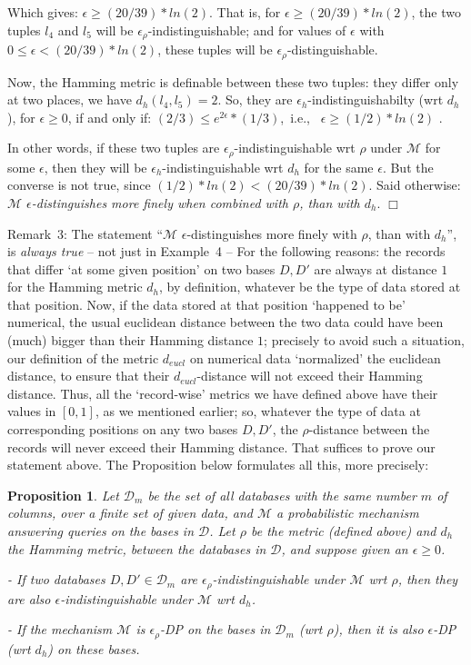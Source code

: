 \documentclass[pdflatex]{article}
\def \D {{\mathcal{D}}}
\def \M {{\mathcal{M}}}
\newtheorem{propn}{Proposition}
\def \lft {\noindent}
\begin{document}
  \lft
  Which gives: $\epsilon \ge (20/39)*ln(2)$. That is, for $\epsilon \ge (20/39)*ln(2)$, the
  two tuples $l_4$ and $l_5$ will be $\epsilon_{\rho}$-indistinguishable; and for  values of
  $\epsilon$ with $0 \le \epsilon <   (20/39)*ln(2)$, these tuples will be
  $\epsilon_{\rho}$-distinguishable.

  Now, the Hamming metric is definable between these two tuples: they differ
  only  at two places, we have $d_h(l_4, l_5) =  2$.  So, they are 
  $\epsilon_h$-indistinguishabilty (wrt $d_h$),  for $\epsilon  \ge 0$,  if and only if: 
  $(2/3)  \le  e^{2 \epsilon}*(1/3)$,\, i.e., \, $\epsilon \ge (1/2)*ln(2)$ .

 In other words, if these two tuples are $\epsilon_{\rho}$-indistinguishable  wrt $\rho$
 under $\M$ for some $\epsilon$, then they will  be $\epsilon_h$-indistinguishable wrt
 $d_h$ for  the same  $\epsilon$. But the converse is not true,  since  
 $(1/2)*ln(2) <  (20/39)*ln(2)$. Said otherwise: {\em  $\M$   $\epsilon$-distinguishes
  more finely when combined with  $\rho$, than with $d_h$}.  \hfill$\Box$

 \vspace*{1mm}
  {\sc Remark}~3:  The statement ``$\M$  $\epsilon$-distinguishes  more finely with 
  $\rho$, than with $d_h$'',  is {\em always true} -- not just in Example~4 -- For the
  following  reasons: the records  that differ `at some  given position' on  two bases
  $D, D'$  are  always at distance $1$ for  the Hamming  metric $d_h$, by definition,
  whatever be  the  type of data stored at that position.
  Now, if the  data stored  at that position `happened to be'  numerical, the usual 
  euclidean distance  between the  two data could have been (much) bigger  than
  their Hamming distance $1$; precisely to avoid such  a situation, our definition  of
  the metric $d_{eucl}$ on numerical data `normalized'  the euclidean  distance,
  to ensure that their $d_{eucl}$-distance will not exceed their Hamming distance.
  Thus, all the `record-wise' metrics  we have defined above  have their values in
  $[0,1]$,  as we mentioned earlier; so, whatever the type of data at corresponding
  positions on any two bases $D, D'$, the $\rho$-distance between the records will
  never exceed their Hamming distance. That suffices to prove our  statement above. 
 The Proposition below formulates all this, more precisely:

  \begin{propn}
    Let  $\D_m$ be the set of all databases  with the same number $m$ of columns,
    over a finite set of given data, and $\M$ a probabilistic mechanism answering
    queries on the  bases  in $\D$.  Let $\rho$ be the metric (defined above) and  $d_h$
    the Hamming metric, between the databases in $\D$, and suppose  given
    an $\epsilon \ge 0$. 
    
    - If two databases $D, D' \in \D_m$ are $\epsilon_{\rho}$-indistinguishable under $\M$
    wrt $\rho$, then they are also  $\epsilon$-indistinguishable under $\M$ wrt $d_h$.
   
    - If the mechanism $\M$  is  $\epsilon_{\rho}$-DP on the bases in $\D_m$ (wrt $\rho$),
    then it is also $\epsilon$-DP (wrt $d_h$) on these bases.   
  \end{propn}
\end{document}
